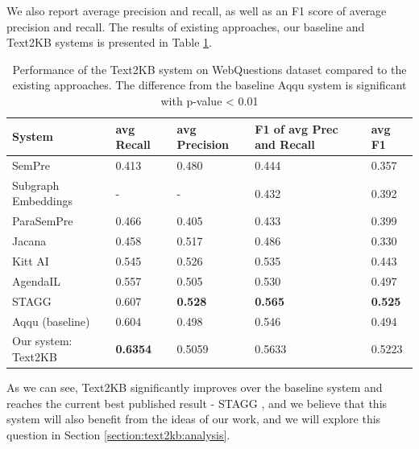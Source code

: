 We also report average precision and recall, as well as an F1 score of average precision and recall.
The results of existing approaches, our baseline and Text2KB systems is presented in Table \ref{table:text2kb:webquestions_results}.

\begin{table}
\centering
\caption{Performance of the Text2KB system on WebQuestions dataset compared to the existing approaches. The difference from the baseline Aqqu system is significant with p-value < 0.01}
\label{table:text2kb:webquestions_results}
\begin{tabular}{| p{5cm} | p{1.5cm} | p{1.5cm} | p{1.5cm} | p{1.5cm} | }
\hline
System & avg Recall & avg Precision & F1 of avg Prec and Recall & avg F1 \\
\hline
SemPre \cite{BerantCFL13:sempre} & 0.413 & 0.480 & 0.444 & 0.357\\
Subgraph Embeddings \cite{BordesCW14:emnlp} & - & - & 0.432 & 0.392\\
ParaSemPre \cite{BerantL14:parasempre} & 0.466 & 0.405 & 0.433 & 0.399\\
Jacana \cite{YaoD14} & 0.458 & 0.517 & 0.486 & 0.330\\
Kitt AI \cite{yao-scratch-qa-naacl2015} & 0.545 & 0.526 & 0.535 & 0.443\\
AgendaIL \cite{berant2015imitation} & 0.557 & 0.505 & 0.530 & 0.497\\
STAGG \cite{yih:ACL:2015:STAGG} & 0.607 & \textbf{0.528} & \textbf{0.565} & \textbf{0.525}\\
\hline
Aqqu (baseline) \cite{bastmore:cikm:2015:aquu} & 0.604 & 0.498 & 0.546 & 0.494\\
Our system: Text2KB & \textbf{0.6354} & 0.5059 & 0.5633 & 0.5223 \\
\hline
\end{tabular}
\end{table}

As we can see, Text2KB significantly improves over the baseline system and reaches the current best published result - STAGG \cite{yih:ACL:2015:STAGG}, and we believe that this system will also benefit from the ideas of our work, and we will explore this question in Section \ref{section:text2kb:analysis}.


